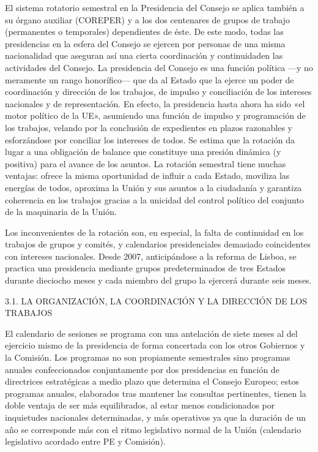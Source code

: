 \documentclass[10pt,a4paper]{article}
\begin{document}
El sistema rotatorio semestral en la Presidencia del Consejo se aplica también a su órgano auxiliar (COREPER) y a los dos centenares de grupos de trabajo (permanentes o temporales) dependientes de éste. De este modo, todas las presidencias en la esfera del Consejo se ejercen por personas de una misma nacionalidad que aseguran así una cierta coordinación y continuidaden las actividades del Consejo. La presidencia del Consejo es una función política —y no meramente un rango honorífico— que da al Estado que la ejerce un poder de coordinación y dirección de los trabajos, de impulso y conciliación de los intereses nacionales y de representación. En efecto, la presidencia hasta ahora ha sido «el motor político de la UE», asumiendo una función de impulso y programación de los trabajos, velando por la conclusión de expedientes en plazos razonables y esforzándose por conciliar los intereses de todos. Se estima que la rotación da lugar a una obligación de balance que constituye una presión dinámica (y positiva) para el avance de los asuntos. La rotación semestral tiene muchas ventajas: ofrece la misma oportunidad de influir a cada Estado, moviliza las energías de todos, aproxima la Unión y sus asuntos a la ciudadanía y garantiza  coherencia en los trabajos gracias a la unicidad del control político del conjunto de la maquinaria de la Unión.

Los inconvenientes de la rotación son, en especial, la falta de continuidad en los trabajos de grupos y comités, y calendarios presidenciales demasiado coincidentes con intereses nacionales. Desde 2007, anticipándose a la reforma de Lisboa, se practica una presidencia mediante grupos predeterminados de tres Estados durante dieciocho meses y cada miembro del grupo la ejercerá durante seis meses.

3.1. LA ORGANIZACIÓN, LA COORDINACIÓN Y LA DIRECCIÓN DE LOS
TRABAJOS

El calendario de sesiones se programa con una antelación de siete meses al del ejercicio mismo de la presidencia de forma concertada con los otros Gobiernos y la Comisión. Los programas no son propiamente semestrales sino programas anuales confeccionados conjuntamente por dos presidencias en función de directrices estratégicas a medio plazo que determina el Consejo Europeo; estos programas anuales, elaborados tras mantener las consultas pertinentes, tienen la doble ventaja de ser más equilibrados, al estar menos condicionados por inquietudes nacionales determinadas, y más operativos ya que la duración de un año se corresponde más con el ritmo legislativo normal de la Unión
(calendario legislativo acordado entre PE y Comisión). 
\end{document}
